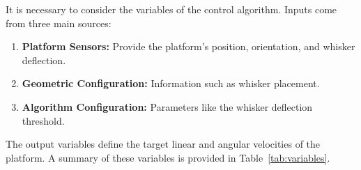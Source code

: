 It is necessary to consider the variables of the control algorithm.
Inputs come from three main sources:
\begin{enumerate}
    \item \textbf{Platform Sensors:} Provide the platform's position, orientation, and whisker deflection.
    \item \textbf{Geometric Configuration:} Information such as whisker placement.
    \item \textbf{Algorithm Configuration:} Parameters like the whisker deflection threshold.
\end{enumerate}
The output variables define the target linear and angular velocities of the platform.
A summary of these variables is provided in Table~\ref{tab:variables}.

\newcommand{\branch}[3]{%
    \scalebox{0.75}{$\left\{
                         \begin{array}{@{}l@{\quad}l@{}}
                             #2, & \text{if } #1,\\[0.5em]
                             #3, & \text{otherwise.}
                         \end{array}
    \right.$}%
}


